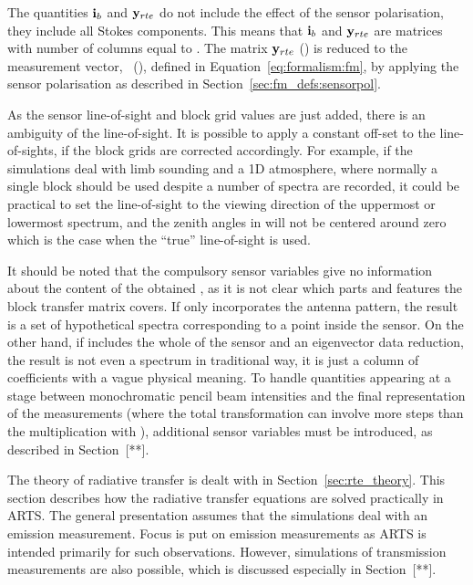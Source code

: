 The quantities $\mathbf{i}_{b}$ and $\mathbf{y}_{rte}$ do not include the
effect of the sensor polarisation, they include all Stokes components.
This means that $\mathbf{i}_{b}$ and $\mathbf{y}_{rte}$ are matrices with
number of columns equal to . The matrix
$\mathbf{y}_{rte}$ () is reduced to the measurement
vector, \MsrVct\ (), defined in Equation~\ref{eq:formalism:fm}, by
applying the sensor polarisation as described in
Section~\ref{sec:fm_defs:sensorpol}.

As the sensor line-of-sight and block grid values are just added,
there is an ambiguity of the line-of-sight. It is possible to apply a
constant off-set to the line-of-sights, if the block grids are
corrected accordingly. For example, if the simulations deal with limb
sounding and a 1D atmosphere, where normally a single block should be
used despite a number of spectra are recorded, it could be practical
to set the line-of-sight to the viewing direction of the uppermost or
lowermost spectrum, and the zenith angles in 
will not be centered around zero which is the case when the ``true''
line-of-sight is used.

It should be noted that the compulsory sensor variables give no
information about the content of the obtained \MsrVct, as it is not
clear which parts and features the block transfer matrix covers. If
 only incorporates the antenna pattern, the result is a set
of hypothetical spectra corresponding to a point inside the sensor. On
the other hand, if  includes the whole of the sensor and an
eigenvector data reduction, the result is not even a spectrum in
traditional way, it is just a column of coefficients with a vague
physical meaning. To handle quantities appearing at a stage between
monochromatic pencil beam intensities and the final representation of
the measurements (where the total transformation can involve more
steps than the multiplication with ), additional sensor
variables must be introduced, as described in
Section~[**]. %



\label{sec:fm_defs:rte}

The theory of radiative transfer is dealt with in
Section~\ref{sec:rte_theory}. This section describes how the radiative
transfer equations are solved practically in ARTS. The general
presentation assumes that the simulations deal with an emission
measurement. Focus is put on emission measurements as ARTS is intended
primarily for such observations. However, simulations of transmission
measurements are also possible, which is discussed especially in
Section~[**].%


